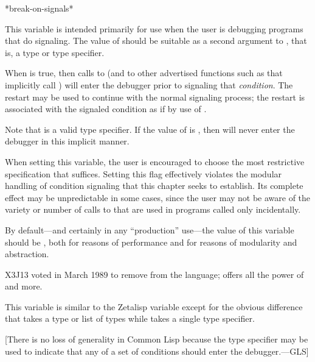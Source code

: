 \begin{defun}[Variable]
*break-on-signals*

  This variable is intended primarily for use when the user is debugging
  programs that do signaling.
  The value of  should be suitable as a second argument to
  , that is, a type or type specifier.

  When  is true, then calls to
   (and to other advertised functions such as  that
  implicitly call ) will enter the debugger prior to signaling
  that \emph{condition}. The  restart may be used to continue with
  the normal signaling process;
the restart is associated with the signaled condition as if by
use of .

  Note that  is a valid type specifier.  If the value of
   is , then  will never
  enter the debugger in this implicit manner.

  When setting this variable, the user is encouraged to choose the
  most restrictive specification that suffices. Setting this flag
  effectively violates the modular handling of condition signaling
  that this chapter seeks to establish. Its complete effect may be
  unpredictable in some cases, since the user may not be aware of the
  variety or number of calls to  that are used in programs
  called only incidentally.

  By default---and certainly in any ``production'' use---the value
  of this variable should be , both for reasons of performance and
  for reasons of modularity and abstraction.

\begin{newer}
X3J13 voted in March 1989
to remove  from the language;
 offers all the power of
   and more.
\end{newer}

\beforenoterule
  \begin{incompatibility}
  This variable is similar to the Zetalisp
  variable  except for the obvious difference that
   takes a type or list of types while
   takes a single type specifier.

  [There is no loss of generality in Common Lisp
  because the  type specifier may be used to indicate that
  any of a set of conditions should enter the debugger.---GLS]
  \end{incompatibility}
\afternoterule
\end{defun}


